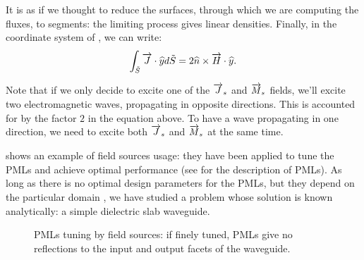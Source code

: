 \begin{description}
  It is as if we thought to reduce the surfaces, through which we are
  computing the fluxes, to segments: the limiting process gives linear
  densities. Finally, in the coordinate system of
  , we can write:
  \begin{equation*}
    \int_{\tilde{S}}{{\overrightarrow{J} \cdot \widehat{y}}d\tilde{S}} = 2{{\widehat{n} \times \overrightarrow{H}} \cdot \widehat{y}}.
  \end{equation*}

  Note that if we only decide to excite one of the $\overrightarrow{J}_s$ and $\overrightarrow{M}_s$
  fields, we'll excite two electromagnetic waves, propagating in
  opposite directions. This is accounted for by the factor $2$ in the
  equation above. To have a wave propagating in one direction, we
  need to excite both $\overrightarrow{J}_s$ and $\overrightarrow{M}_s$ at the same time. 
\end{description}

 shows an example of field sources usage: they
have been applied to tune the PMLs and achieve optimal performance (see
 for the description of PMLs). As
long as there is no optimal design parameters for the PMLs, but they
depend on the particular domain \cite{taflove_computational}, we have
studied a problem whose solution is known analytically: a simple
dielectric slab waveguide.

\begin{figure}[htbp]
  \begin{center}
  \end{center}
  \caption{PMLs tuning by field sources: if finely tuned, PMLs give no
    reflections to the input and output facets of the waveguide.}
  \label{fig:pml_tuning}
\end{figure}  

